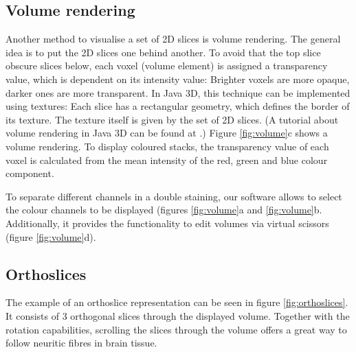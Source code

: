 \documentclass[a4paper,10pt]{article}
\begin{document}
\subsection{Volume rendering}
Another method to visualise a set of 2D slices is volume rendering.
The general idea is to put the 2D slices one behind another. To avoid that the top slice obscure slices below, each voxel (volume element) is assigned a transparency value, which is dependent on its intensity value: Brighter voxels are more opaque, darker ones are more transparent.
In Java 3D, this technique can be implemented using textures: Each slice has a rectangular geometry, which defines the border of its texture. The texture itself is given by the set of 2D slices. (A tutorial about volume rendering in Java 3D can be found at \cite{volrend}.)
Figure \ref{fig:volume}c shows a volume rendering. To display coloured stacks, the transparency value of each voxel is calculated from the mean intensity of the red, green and blue colour component.

To separate different channels in a double staining, our software allows to select the colour channels to be displayed (figures \ref{fig:volume}a and \ref{fig:volume}b. Additionally, it provides the functionality to edit volumes via virtual scissors (figure \ref{fig:volume}d).

\subsection{Orthoslices}
The example of an orthoslice representation can be seen in figure \ref{fig:orthoslices}.
It consists of 3 orthogonal slices through the displayed volume. Together with the rotation capabilities, scrolling the slices through the volume offers a great way to follow neuritic fibres in brain tissue.
\end{document}
